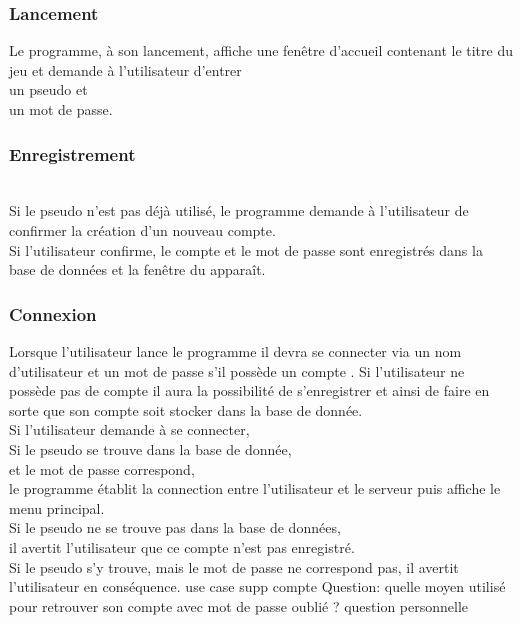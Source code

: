 \documentclass[french, utf8]{article}
\begin{document}
\subsubsection{Lancement}
\label{sec:Lancement}
Le programme, à son lancement,
affiche une fenêtre d'accueil contenant le titre du jeu et demande à l’utilisateur d'entrer
\\un pseudo et
\\un mot de passe.


\subsubsection{Enregistrement}
\label{sec:Enregistrement}

\\ Si le pseudo  n’est pas déjà utilisé, le programme demande à l'utilisateur de confirmer la création d'un nouveau compte.
\\Si l'utilisateur confirme, le compte et le mot de passe sont enregistrés dans
la base de données et la fenêtre du
 apparaît.

\subsubsection{Connexion}
\label{sec:Connexion}
Lorsque l'utilisateur lance le programme il devra se connecter via un nom d'utilisateur et un mot de passe s'il  possède un compte . Si l'utilisateur ne possède pas de compte il aura la possibilité de s'enregistrer et ainsi de faire en sorte que son compte soit stocker dans la base de donnée.
\newline
\\Si l’utilisateur demande à se connecter,
        \\Si le pseudo se trouve dans la base de donnée,
            \\et le mot de passe correspond,
                \\le programme établit la connection entre l'utilisateur et le serveur
                puis affiche le menu principal.
        \\Si le pseudo ne se trouve pas dans la base de données,
            \\il avertit l'utilisateur que ce compte n'est pas enregistré.
        \\Si le pseudo s'y trouve, mais le mot de passe ne correspond
pas,
            il avertit l'utilisateur en conséquence.
\newline
use case
supp compte
Question: quelle moyen utilisé pour retrouver son compte avec mot de passe oublié ? question personnelle
\end{document}
